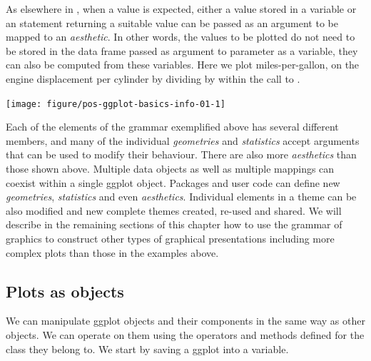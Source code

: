 \documentclass[krantz2]{krantz}\usepackage{knitr}%
\begin{document}
\begin{infobox}
As elsewhere in \Rlang, when a value is expected, either a value stored in a variable or an statement returning a suitable value can be passed as an argument to be mapped to an \emph{aesthetic}. In other words, the values to be plotted do not need to be stored in the data frame passed as argument to parameter  as a variable, they can also be computed from these variables. Here we plot miles-per-gallon,  on the engine displacement per cylinder by dividing  by  within the call to .

\begin{knitrout}\footnotesize
{}\color{fgcolor}\begin{kframe}
\begin{alltt}
\hlstd{(}  \hlstd{(}  \hlopt{/}    \hlopt{+}
  \hlstd{()}
\end{alltt}
\end{kframe}

{\centering \texttt{[image: figure/pos-ggplot-basics-info-01-1]} 

}



\end{knitrout}

\end{infobox}

Each of the elements of the grammar exemplified above has several different members, and many of the individual \emph{geometries} and \emph{statistics} accept arguments that can be used to modify their behaviour. There are also more \emph{aesthetics} than those shown above. Multiple data objects as well as multiple mappings can coexist within a single ggplot object. Packages and user code can define new \emph{geometries}, \emph{statistics} and even \emph{aesthetics}. Individual elements in a theme can be also modified and new complete themes created, re-used and shared. We will describe in the remaining sections of this chapter how to use the grammar of graphics to construct other types of graphical presentations including more complex plots than those in the examples above.

\subsection{Plots as \Rlang objects}
We can manipulate ggplot objects and their components in the same way as other \Rlang objects. We can operate on them using the operators and methods defined for the  class they belong to. We start by saving a ggplot into a variable.
\end{document}

